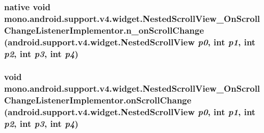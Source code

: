 \hypertarget{classmono_1_1android_1_1support_1_1v4_1_1widget_1_1_nested_scroll_view___on_scroll_change_listener_implementor_29827e9faa7e0ddab1f71db351c1c83a}{
\subsubsection[{n\_\-onScrollChange}]{\setlength{\rightskip}{0pt plus 5cm}native void mono.android.support.v4.widget.NestedScrollView\_\-OnScrollChangeListenerImplementor.n\_\-onScrollChange (android.support.v4.widget.NestedScrollView {\em p0}, \/  int {\em p1}, \/  int {\em p2}, \/  int {\em p3}, \/  int {\em p4})}}
\label{classmono_1_1android_1_1support_1_1v4_1_1widget_1_1_nested_scroll_view___on_scroll_change_listener_implementor_29827e9faa7e0ddab1f71db351c1c83a}


\hypertarget{classmono_1_1android_1_1support_1_1v4_1_1widget_1_1_nested_scroll_view___on_scroll_change_listener_implementor_e77ca61884b43630951540c3040667fe}{
\subsubsection[{onScrollChange}]{\setlength{\rightskip}{0pt plus 5cm}void mono.android.support.v4.widget.NestedScrollView\_\-OnScrollChangeListenerImplementor.onScrollChange (android.support.v4.widget.NestedScrollView {\em p0}, \/  int {\em p1}, \/  int {\em p2}, \/  int {\em p3}, \/  int {\em p4})}}
\label{classmono_1_1android_1_1support_1_1v4_1_1widget_1_1_nested_scroll_view___on_scroll_change_listener_implementor_e77ca61884b43630951540c3040667fe}




